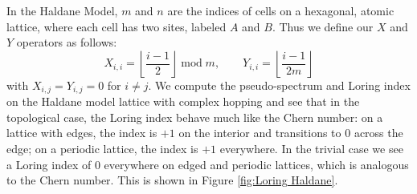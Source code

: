 \documentclass[a4paper]{article}
\begin{document}
In the Haldane Model, $m$ and $n$ are the indices of cells on a hexagonal, atomic lattice, where each cell has two sites, labeled $A$ and $B$.
Thus we define our $X$ and $Y$ operators as follows:
$$X_{i,i} = \left\lfloor \frac{i-1}{2} \right\rfloor \;\text{mod}\;m, \quad\quad Y_{i,i} = \left\lfloor \frac{i-1}{2m} \right\rfloor$$
with $X_{i,j} = Y_{i,j} = 0$ for $i \neq j$. 
We compute the pseudo-spectrum and Loring index on the Haldane model lattice with complex hopping and see that in the topological case, the Loring index behave much like the Chern number: on a lattice with edges, the index is $+1$ on the interior and transitions to 0 across the edge; on a periodic lattice, the index is $+1$ everywhere. In the trivial case we see a Loring index of 0 everywhere on edged and periodic lattices, which is analogous to the Chern number. This is shown in Figure \ref{fig:Loring Haldane}.
\end{document}
